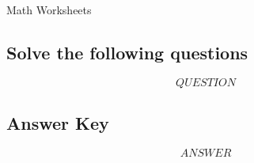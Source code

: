 \documentclass[fleqn]{article}
\begin{document}
\begin{center}
{\Large Math Worksheets}\\
\end{center}

\subsection*{Solve the following questions}

\begin{enumerate}
$$QUESTION$$

\end{enumerate}

\subsection*{Answer Key}

\begin{enumerate}
$$ANSWER$$
\end{enumerate}
\end{document}
